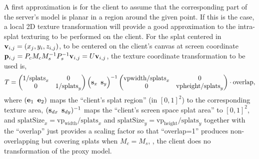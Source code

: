 A first approximation is for the client to assume that the corresponding part of
the server's model is planar in a region around the given point. If this is the
case, a local 2D texture transformation will provide a good approximation to the
intra-splat texturing to be performed on the client. For the splat centered in
$\mathbf{v}_{i, j} = (x_j, y_i, z_{i, j})$, to be centered on the client's canvas at
screen coordinate $\mathbf{p}_{i, j} = P_c M_c M_s^{-1} P_s^{-1}\mathbf{v}_{i, j} = U\mathbf{v}_{i,
j}$, the texture coordinate transformation to be used is,
\[
  T =
  \begin{pmatrix} 1/\text{splats}_x & 0 \\ 0 & 1/\text{splats}_y \end{pmatrix}
  \Big( \mathbf{s}_x \, \, \, \mathbf{s}_y \Big)^{-1}
  \begin{pmatrix} \text{vpwidth}/\text{splats}_x & 0 \\ 0 & \text{vpheight}/\text{splats}_y \end{pmatrix}
  \cdot \text{overlap},
\]
where $(\mathbf{e}_1 \, \, \, \mathbf{e}_2)$ maps the ``client's splat region'' (in $[0,
1]^2$) to the corresponding texture area, $(\mathbf{s}_{dx} \, \, \, \mathbf{s}_{dy})^{-1}$
maps the ``client's screen space splat area'' to $[0, 1]^2$, and $\text{splatSize}_x
= \text{vp}_\text{width}/\text{splats}_x$ and $\text{splatSize}_y
= \text{vp}_\text{height}/\text{splats}_y$ together with the ``overlap'' just
provides a scaling factor so that ``overlap=1'' produces non-overlapping but
covering splats when $M_c=M_s$, \ie, the client does no transformation of the
proxy model.


